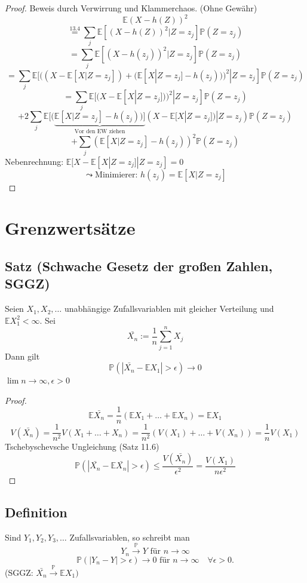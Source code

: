 \documentclass[a4paper,11pt,notitlepage]{report}
\newcommand{\Prim}{{\ensuremath{\mathbb{P}}}}
\newcommand{\E}{{\ensuremath{\mathbb{E}}}}
\begin{document}
\begin{proof} Beweis durch Verwirrung und Klammerchaos. (Ohne Gewähr)
	$$\E (X - h(Z))^2$$
	$$\overset{13.4}{=} \sum\limits_j{\E [(X-h(Z))^2 | Z=z_j] \Prim(Z=z_j)}$$
	$$= \sum\limits_j{\E [(X-h(z_j))^2 | Z=z_j] \Prim(Z=z_j)}$$
	$$= \sum\limits_j{\E [((X- \E[X | Z=z_j]) + (\E [X | Z = z_j] - h(z_j)))^2 | Z = z_j] \Prim(Z=z_j)}$$
	$$= \sum\limits_j{\E [(X-\E [X|Z=z_j]))^2 | Z = z_j] \Prim(Z=z_j)}$$
	$$ + 2 \sum\limits_j{\E [(\underbrace{\E [X|Z=z_j] - h(z_j))]}_{\text{Vor den EW ziehen}} (X-\E[X|Z=z_j]) | Z = z_j) \Prim(Z=z_j)}$$
	$$ + \sum\limits_j{(\E [X|Z=z_j]- h(z_j))^2 \Prim(Z=z_j)}$$
	Nebenrechnung: $\E[X - \E [X | Z = z_j]| Z = z_j] = 0$
	$$\leadsto \text{Minimierer: } h(z_j) = \E [X | Z = z_j]$$
\end{proof}

\chapter{Grenzwertsätze}

\section{Satz (Schwache Gesetz der großen Zahlen, SGGZ)}

Seien $X_1, X_2, \ldots$ unabhängige Zufallsvariablen mit gleicher Verteilung und $\E X_1 ^2 < \infty$. Sei
$$\bar{X_n} := \frac{1}{n} \sum\limits_{j=1}^n{X_j}$$
Dann gilt
$$\Prim(|\bar{X_n} - \E X_1| > \epsilon) \rightarrow 0$$
$\lim n \rightarrow \infty, \epsilon > 0$

\begin{proof}
	$$\E \bar{X_n} = \frac{1}{n} (\E X_1 + \ldots + \E X_n) = \E X_1$$
	$$V(\bar{X_n}) = \frac{1}{n^2} V(X_1 + \ldots + X_n) = \frac{1}{n^2} (V(X_1) + \ldots + V(X_n)) = \frac{1}{n} V(X_1)$$
	Tschebyschevsche Ungleichung (Satz 11.6)
	$$\Prim(|\bar{X_n}- \E \bar{X_n}| > \epsilon) \leq \frac{V(\bar{X_n})}{\epsilon^2} = \frac{V(X_1)}{n \epsilon^2}$$
\end{proof}

\section{Definition}
Sind $Y_1, Y_2, Y_3, \ldots$ Zufallsvariablen, so schreibt man
$$Y_n \overset{\Prim}{\rightarrow} Y \text{ für } n \rightarrow \infty$$
$$\Prim(|Y_n - Y| > \epsilon) \rightarrow 0 \text{ für } n \rightarrow \infty \quad \forall \epsilon > 0.$$
(SGGZ: $\bar{X_n} \overset{\Prim}{\rightarrow} \E X_1)$
\end{document}
